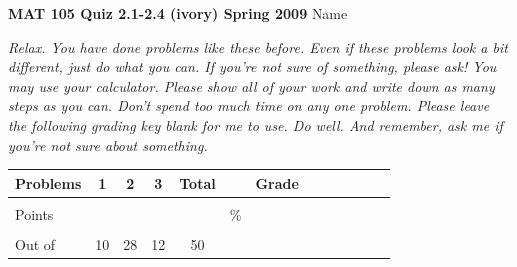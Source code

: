 \documentclass[12pt]{article}
\begin{document}
{\bf MAT 105 Quiz 2.1-2.4 (ivory) Spring 2009} \hspace{.4in} {\large Name} \hrulefill

\hrulefill

 \emph{Relax.  You have done problems like these before.  Even if these problems look a bit different, just do what you can.  If you're not sure of something, please ask! You may use your calculator.  Please show all of your work and write down as many steps as you can.  Don't spend too much time on any one problem.  Please leave the following grading key blank for me to use.  Do well.  And remember, ask me if you're not sure about something.}

\begin{center}

\begin{tabular}
{|l|c|c|c|c|c|c|c|c|c|c|c|c|} \hline

 Problems & \hspace{5 pt} 1 \hspace{5 pt}  & \hspace{5 pt} 2 \hspace{5 pt} & \hspace{5 pt} 3 \hspace{5 pt} &  \hspace{5 pt} Total  \hspace{5 pt} & &  \hspace{5 pt} Grade \hspace{5 pt}  \\ \hline
&&&&&&\\  
Points &&&&&    \hspace{.8in}\% &  \\ 
&&&&&& \\  \hline
Out of & 10 & 28 & 12 &50 & & \\ \hline

\end {tabular}

\end{center}

\hrulefill
\end{document}
